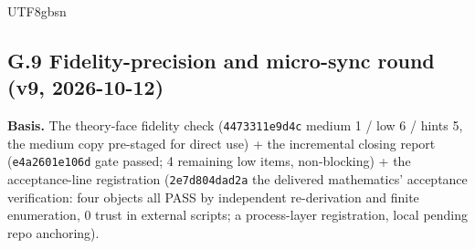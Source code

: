 \documentclass[11pt,letterpaper]{article}
\begin{document}
\begin{CJK}{UTF8}{gbsn}
\subsection*{G.9 Fidelity-precision and micro-sync round (v9, 2026-10-12)}

\textbf{Basis.} The theory-face fidelity check (\texttt{4473311e9d4c} \textemdash{} medium 1 / low 6 / hints 5, the medium copy pre-staged for direct use) + the incremental closing report (\texttt{e4a2601e106d} \textemdash{} gate passed; 4 remaining low items, non-blocking) + the acceptance-line registration (\texttt{2e7d804dad2a} \textemdash{} the delivered mathematics' acceptance verification: four objects all PASS by independent re-derivation and finite enumeration, 0 trust in external scripts; a process-layer registration, local pending repo anchoring).


\end{CJK}
\end{document}
